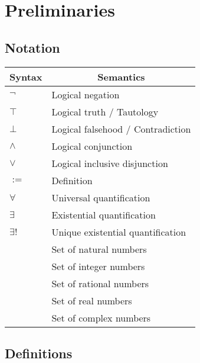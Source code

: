 \chapter{Preliminaries}

\section{Notation}

\begin{center}
    \begin{tabular}{>{\centering}m{1.5cm} m{6cm}}
    \toprule
    \textbf{Syntax} & \multicolumn{1}{c}{\textbf{Semantics}} \\
    \midrule
    \(\lnot\) & Logical negation \\
    \(\top\)  & Logical truth / Tautology \\
    \(\bot\)  & Logical falsehood / Contradiction \\
    \(\land\) & Logical conjunction \\
    \(\lor\) & Logical inclusive disjunction \\
    \(:=\)   & Definition \\
    \(\forall\) & Universal quantification \\
    \(\exists\) & Existential quantification \\
    \(\exists!\) & Unique existential quantification \\
    \N & Set of natural numbers \\
    \Z & Set of integer numbers \\
    \Q & Set of rational numbers \\
    \R & Set of real numbers \\
    \C & Set of complex numbers \\
    \bottomrule
    \end{tabular}
\end{center}


\section{Definitions}



